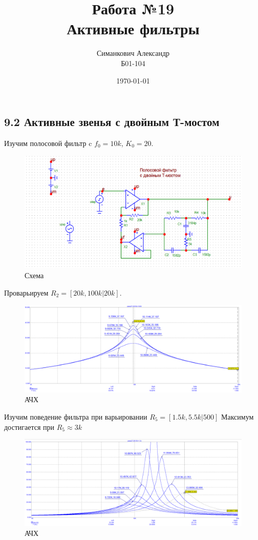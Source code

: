 \documentclass[12pt,a4paper]{article}
\title{Работа №19\\ Активные фильтры}
\author{Симанкович Александр \\ Б01-104}
\date{\today}
\begin{document}
	\maketitle	
	
	\subsection*{9.2 Активные звенья с двойным Т-мостом}
	
	Изучим полосовой фильтр c $f_0 = 10k$, $K_0 = 20$.
	
	\begin{figure}[H]
		\centering
		\includegraphics[width=1.0\linewidth]{res/pass2T_scheme.png}
		\caption{Схема}
		\label{scheme}
	\end{figure}
	
	Проварьируем $R_2 = [20k, 100k | 20k]$.

	\begin{figure}[H]
		\centering
		\includegraphics[width=1.0\linewidth]{res/pass2T_R2.png}
		\caption{АЧХ}
		\label{scheme}
	\end{figure}
	
	Изучим поведение фильтра при варьировании $R_5 = [1.5k, 5.5k | 500]$
	Максимум достигается при $R_5 \approx 3k$
	\begin{figure}[H]
		\centering
		\includegraphics[width=1.0\linewidth]{res/pass2T_R5.png}
		\caption{АЧХ}
		\label{scheme}
	\end{figure}
	
\end{document}
